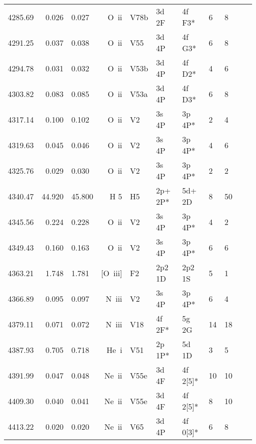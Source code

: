 \begin{longtable}{lrlrlllllll}
 4285.69 &   0.026 &   0.027 &  O~{\sc ii}      &  V78b      &  3d 2F     &  4f F3*    &          6 &        8    \\
 4291.25 &   0.037 &   0.038 &  O~{\sc ii}      &  V55       &  3d 4P     &  4f G3*    &          6 &        8    \\
 4294.78 &   0.031 &   0.032 &  O~{\sc ii}      &  V53b      &  3d 4P     &  4f D2*    &          4 &        6    \\
 4303.82 &   0.083 &   0.085 &  O~{\sc ii}      &  V53a      &  3d 4P     &  4f D3*    &          6 &        8    \\
 4317.14 &   0.100 &   0.102 &  O~{\sc ii}      &  V2        &  3s 4P     &  3p 4P*    &          2 &        4    \\
 4319.63 &   0.045 &   0.046 &  O~{\sc ii}      &  V2        &  3s 4P     &  3p 4P*    &          4 &        6    \\
 4325.76 &   0.029 &   0.030 &  O~{\sc ii}      &  V2        &  3s 4P     &  3p 4P*    &          2 &        2    \\
 4340.47 &  44.920 &  45.800 &  H 5       &  H5        &  2p+ 2P*   &  5d+ 2D    &          8 &       50          \\
 4345.56 &   0.224 &   0.228 &  O~{\sc ii}      &  V2        &  3s 4P     &  3p 4P*    &          4 &        2    \\
 4349.43 &   0.160 &   0.163 &  O~{\sc ii}      &  V2        &  3s 4P     &  3p 4P*    &          6 &        6    \\
 4363.21 &   1.748 &   1.781 &  [O~{\sc iii}]   &  F2        &  2p2 1D    &  2p2 1S    &          5 &        1    \\
 4366.89 &   0.095 &   0.097 &  N~{\sc iii}     &  V2        &  3s 4P     &  3p 4P*    &          6 &        4    \\
 4379.11 &   0.071 &   0.072 &  N~{\sc iii}     &  V18       &  4f 2F*    &  5g 2G     &         14 &       18    \\
 4387.93 &   0.705 &   0.718 &  He~{\sc i}      &  V51       &  2p 1P*    &  5d 1D     &          3 &        5    \\
 4391.99 &   0.047 &   0.048 &  Ne~{\sc ii}     &  V55e      &  3d 4F     &  4f 2[5]*  &         10 &       10    \\
 4409.30 &   0.040 &   0.041 &  Ne~{\sc ii}     &  V55e      &  3d 4F     &  4f 2[5]*  &          8 &       10    \\
 4413.22 &   0.020 &   0.020 &  Ne~{\sc ii}     &  V65       &  3d 4P     &  4f 0[3]*  &          6 &        8    \\

\end{longtable}
